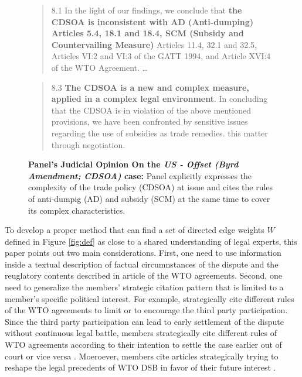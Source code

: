 \begin{figure}[h]
    \begin{quote}
        8.1 In the light of our findings, we conclude that \textbf{the CDSOA is inconsistent with AD (Anti-dumping)
        Articles 5.4, 18.1 and 18.4, SCM (Subsidy and Countervailing Measure)} Articles 11.4, 32.1 and 32.5, Articles VI:2 and VI:3 of the GATT
        1994, and Article XVI:4 of the WTO Agreement. \ldots
    \end{quote} 
    \begin{quote}
        8.3 \textbf{The CDSOA is a new and complex measure, applied in a complex legal environment}. In
        concluding that the CDSOA is in violation of the above mentioned provisions, we have been
        confronted by sensitive issues regarding the use of subsidies as trade remedies.
        this matter through negotiation.
    \end{quote} 
    \caption{\textbf{Panel's Judicial Opinion On the \textit{US - Offset (Byrd Amendment; CDSOA)} case:} Panel explicitly expresses the complexity of the trade policy (CDSOA) at issue and cites the rules of anti-dumpig (AD) and subsidy (SCM) at the same time to cover its complex characteristics.}
    \label{fig:complex-measure}
\end{figure}

To develop a proper method that can find a set of directed edge weights $W$ defined in Figure \ref{fig:def}
as close to a shared understanding of legal experts, this paper points out two main considerations. 
First, one need to use information inside a textual description of factual circumnstances of the dispute and the reuglatory contents described in article of the WTO agreements.
Second, one need to generalize the members' strategic citation pattern that is limited to a member's specific political interest.
For example,
strategically cite different rules of the WTO agreements to limit or to encourage
the third party participation. Since the third party participation
can lead to early settlement of the dispute without continuous
legal battle, members strategically cite different rules of WTO agreements according to their intention to
settle the case earlier out of court or vice versa \citep{who_gets}. Moeroever, members cite articles strategically trying to reshape the legal precedents of WTO DSB
in favor of their future interest \citep{pelc, latent}. 

